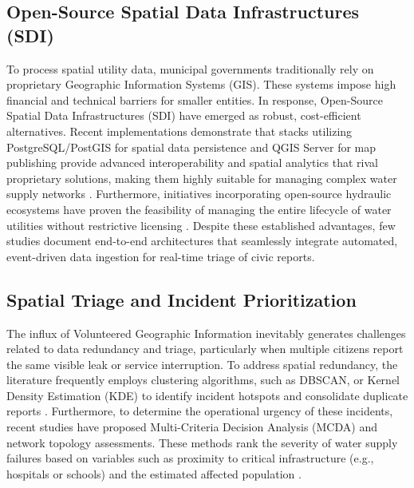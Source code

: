 \documentclass[conference]{IEEEtran}
\begin{document}
\subsection{Open-Source Spatial Data Infrastructures (SDI)}

To process spatial utility data, municipal governments traditionally rely on proprietary Geographic Information Systems (GIS). These systems impose high financial and technical barriers for smaller entities. In response, Open-Source Spatial Data Infrastructures (SDI) have emerged as robust, cost-efficient alternatives. Recent implementations demonstrate that stacks utilizing PostgreSQL/PostGIS for spatial data persistence and QGIS Server for map publishing provide advanced interoperability and spatial analytics that rival proprietary solutions, making them highly suitable for managing complex water supply networks \cite{brovelli2016}. Furthermore, initiatives incorporating open-source hydraulic ecosystems have proven the feasibility of managing the entire lifecycle of water utilities without restrictive licensing \cite{brovelli2016}. Despite these established advantages, few studies document end-to-end architectures that seamlessly integrate automated, event-driven data ingestion for real-time triage of civic reports.

\subsection{Spatial Triage and Incident Prioritization}

The influx of Volunteered Geographic Information inevitably generates challenges related to data redundancy and triage, particularly when multiple citizens report the same visible leak or service interruption. To address spatial redundancy, the literature frequently employs clustering algorithms, such as DBSCAN, or Kernel Density Estimation (KDE) to identify incident hotspots and consolidate duplicate reports \cite{dealbuquerque2015}. Furthermore, to determine the operational urgency of these incidents, recent studies have proposed Multi-Criteria Decision Analysis (MCDA) and network topology assessments. These methods rank the severity of water supply failures based on variables such as proximity to critical infrastructure (e.g., hospitals or schools) and the estimated affected population \cite{zyoud2016}.
\end{document}
